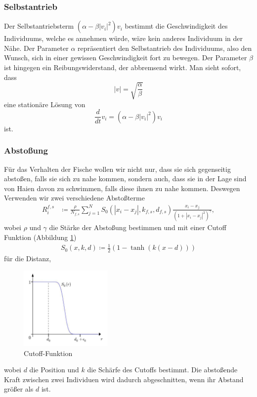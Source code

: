 \documentclass[a4paper,11pt]{article}
\theoremstyle{definition}
\numberwithin{equation}{section}
\begin{document}
	\subsubsection{Selbstantrieb}	
		Der Selbstantriebsterm $(\alpha - \beta |v_i|^2)v_i$ bestimmt die Geschwindigkeit des Individuums, welche es annehmen würde, wäre kein anderes Individuum in der Nähe. Der Parameter $\alpha$ repräsentiert den Selbstantrieb des Individuums, also den Wunsch, sich
in einer gewissen Geschwindigkeit fort zu bewegen. Der Parameter $\beta$ ist hingegen ein Reibungswiderstand, der abbremsend wirkt.
		Man sieht sofort, dass
		\begin{equation}
		|v| = \sqrt{\frac{\alpha}{\beta}}
		\end{equation}
		eine stationäre Lösung von 
	\begin{equation}
		\frac{d}{dt}v_i = (\alpha - \beta |v_i|^2)v_i
		\end{equation}
		ist.
	\subsubsection{Abstoßung}
	Für das Verhalten der Fische wollen wir nicht nur, dass sie sich gegenseitig abstoßen, falls sie sich zu nahe kommen, sondern auch, dass sie in der Lage sind von Haien davon zu schwimmen, falls diese ihnen zu nahe kommen. Deswegen Verwenden wir zwei verschiedene Abstoßterme
	\begin{align*}
		R^{f,s}_i &\coloneqq \frac{\rho}{N_{f,s}}\sum^N_{j=1} S_0(|x_i-x_j|, k_{f,s}, d_{f,s})\frac{x_i-x_j}{\left(1+|x_i-x_j|^2\right)^{\gamma}},
	\end{align*}
	wobei $\rho$ und $\gamma$ die Stärke der Abstoßung bestimmen und mit einer Cutoff Funktion (Abbildung \ref{fig:cutoff})
	\begin{align*}
		S_0(x, k, d) \coloneqq \frac{1}{2}(1-\tanh(k(x-d)))
	\end{align*}
	 für die Distanz,
	\begin{figure}
	\centering
	\includegraphics[width=0.4\textwidth]{pictures/cutoff.png}
		\caption{Cutoff-Funktion \cite{agueh2011analysis}}
		\label{fig:cutoff}
	\end{figure}
	wobei $d$ die Position und $k$ die Schärfe des Cutoffs bestimmt. 
Die abstoßende Kraft zwischen zwei Individuen wird dadurch abgeschnitten, wenn ihr Abstand größer als $d$ ist.
\end{document}

